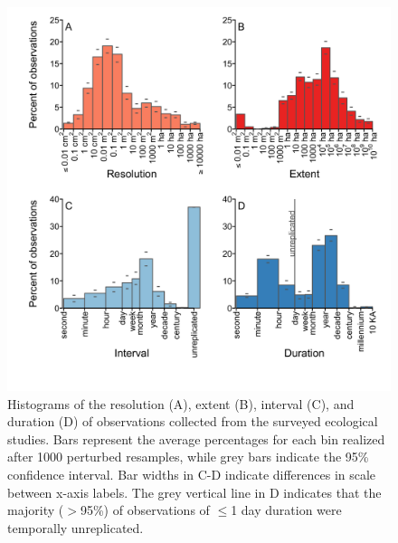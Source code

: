 \documentclass[12pt]{article}
\begin{document}
\begin{figure}[!ht]
\includegraphics[width=1\textwidth]{../vignettes/figures/fig1.png}
\vspace{-0.15 cm}
\caption{Histograms of the resolution (A), extent (B), interval (C), and duration (D) of observations collected from the surveyed ecological studies. Bars represent the average percentages for each bin realized after 1000 perturbed resamples, while grey bars indicate the 95\% confidence interval. Bar widths in C-D indicate differences in scale between x-axis labels. The grey vertical line in D indicates that the majority ($>$95\%) of observations of $\leq$1 day duration were temporally unreplicated.}
\label{afoto1}
\end{figure}
\end{document}
